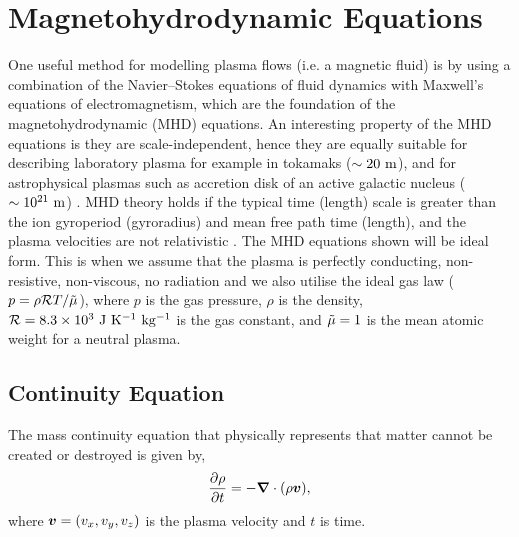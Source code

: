 \section{Magnetohydrodynamic Equations}
\label{section:MHD_eqs}
One useful method for modelling plasma flows (i.e. a magnetic fluid) is by using a combination of the Navier–Stokes equations of fluid dynamics with Maxwell's equations of electromagnetism, which are the foundation of the magnetohydrodynamic (MHD) equations. An interesting property of the MHD equations is they are scale-independent, hence they are equally suitable for describing laboratory plasma for example in tokamaks ($\sim 20~\rm{m}$), and for astrophysical plasmas such as accretion disk of an active galactic nucleus ($\sim 10^{21}~\rm{m}$) \citep{goedbloed2004principles}. MHD theory holds if the typical time (length) scale is greater than the ion gyroperiod (gyroradius) and mean free path time (length), and the plasma velocities are not relativistic \citep{priest2014magnetohydrodynamics}. The MHD equations shown will be ideal form. This is when we assume that the plasma is perfectly conducting, non-resistive, non-viscous, no radiation and we also utilise the ideal gas law ($p = \rho \mathcal{R} T/\Tilde{\mu}$), where $p$ is the gas pressure, $\rho$ is the density, $\mathcal{R}=8.3\times 10^{3}~\rm{J~K^{-1}~kg^{-1}}$ is the gas constant, and $\Tilde{\mu}=1$ is the mean atomic weight for a neutral plasma.
\subsection{Continuity Equation}
\label{section:cont_eq}
The mass continuity equation that physically represents that matter cannot be created or destroyed is given by,
\begin{equation}\label{eq86}
\frac{\partial \rho}{\partial t} = - \boldsymbol{\nabla} \cdot (\rho \boldsymbol{v}),
\end{equation}
where $\boldsymbol{v}=(v_x,v_y,v_z)$ is the plasma velocity and $t$ is time. 
